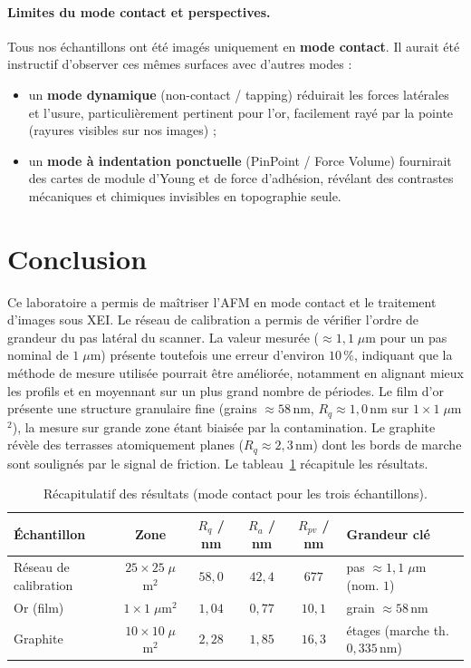 \documentclass[a4paper,10pt]{article}
\begin{document}
\paragraph{Limites du mode contact et perspectives.}
Tous nos échantillons ont été imagés uniquement en \textbf{mode contact}. Il aurait
été instructif d'observer ces mêmes surfaces avec d'autres modes :
\begin{itemize}
    \item un \textbf{mode dynamique} (non-contact / tapping) réduirait les forces
          latérales et l'usure, particulièrement pertinent pour l'or, facilement rayé
          par la pointe (rayures visibles sur nos images) ;
    \item un \textbf{mode à indentation ponctuelle} (PinPoint / Force Volume)
          fournirait des cartes de module d'Young et de force d'adhésion, révélant des
          contrastes mécaniques et chimiques invisibles en topographie seule.
\end{itemize}

\section{Conclusion}

Ce laboratoire a permis de maîtriser l'AFM en mode contact et le traitement d'images
sous XEI. Le réseau de calibration a permis de vérifier l'ordre de grandeur du pas
latéral du scanner. La valeur mesurée ($\approx 1{,}1\;\mu$m pour un pas nominal
de $1\;\mu$m) présente toutefois une erreur d'environ $10\,\%$, indiquant que la
méthode de mesure utilisée pourrait être améliorée, notamment en alignant mieux
les profils et en moyennant sur un plus grand nombre de périodes. Le film d'or présente
une structure granulaire fine (grains $\approx 58$\,nm, $R_q\approx1{,}0$\,nm sur
$1\times1\;\mu$m$^2$), la mesure sur grande zone étant biaisée par la contamination. Le
graphite révèle des terrasses atomiquement planes ($R_q\approx2{,}3$\,nm) dont les bords
de marche sont soulignés par le signal de friction. Le tableau~\ref{tab:recap} récapitule
les résultats.

\begin{table}[H]
\centering
\caption{Récapitulatif des résultats (mode contact pour les trois échantillons).}
\label{tab:recap}
\footnotesize
\begin{tabular}{lccccl}
\toprule
Échantillon & Zone & $R_q$ / nm & $R_a$ / nm & $R_{pv}$ / nm & Grandeur clé \\
\midrule
Réseau de calibration & $25\times25\;\mu$m$^2$ & $58{,}0$ & $42{,}4$ & $677$  & pas $\approx 1{,}1\;\mu$m (nom. $1$) \\
Or (film)             & $1\times1\;\mu$m$^2$   & $1{,}04$ & $0{,}77$ & $10{,}1$ & grain $\approx 58$\,nm \\
Graphite              & $10\times10\;\mu$m$^2$ & $2{,}28$ & $1{,}85$ & $16{,}3$ & étages (marche th. $0{,}335$\,nm) \\
\bottomrule
\end{tabular}
\end{table}
\end{document}
